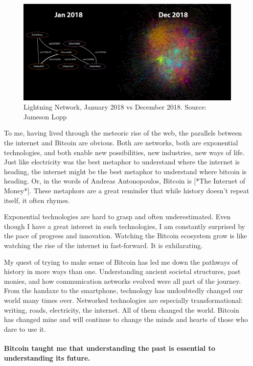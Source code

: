 \begin{figure}
  \includegraphics{assets/images/lnd-growth-lopp-black.png}
  \caption{Lightning Network, January 2018 vs December 2018. Source: Jameson Lopp}
  \label{fig:lnd-growth-lopp-black.png}
\end{figure}

To me, having lived through the meteoric rise of the web, the parallels
between the internet and Bitcoin are obvious. Both are networks, both
are exponential technologies, and both enable new possibilities, new
industries, new ways of life. Just like electricity was the best
metaphor to understand where the internet is heading, the internet might
be the best metaphor to understand where bitcoin is heading. Or, in the
words of Andreas Antonopoulos, Bitcoin is [*The Internet of Money*].
These metaphors are a great reminder that while history doesn't repeat
itself, it often rhymes.

Exponential technologies are hard to grasp and often underestimated.
Even though I have a great interest in such technologies, I am
constantly surprised by the pace of progress and innovation. Watching
the Bitcoin ecosystem grow is like watching the rise of the internet in
fast-forward. It is exhilarating.

My quest of trying to make sense of Bitcoin has led me down the pathways
of history in more ways than one. Understanding ancient societal
structures, past monies, and how communication networks evolved were all
part of the journey. From the handaxe to the smartphone, technology has
undoubtedly changed our world many times over. Networked technologies
are especially transformational: writing, roads, electricity, the
internet. All of them changed the world. Bitcoin has changed mine and
will continue to change the minds and hearts of those who dare to use
it.

\paragraph{Bitcoin taught me that understanding the past is essential to
understanding its future.}

